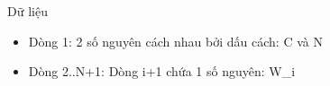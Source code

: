 Dữ liệu
\begin{itemize}
	\item     Dòng 1: 2 số nguyên cách nhau bởi dấu cách: C và N   
	\item     Dòng 2..N+1: Dòng i+1 chứa 1 số nguyên: W\_i   
\end{itemize}